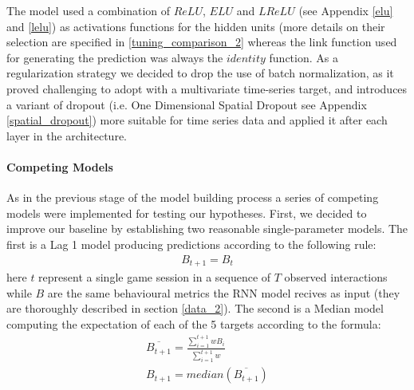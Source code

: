 The model used a combination of $ReLU$, $ELU$ and $LReLU$ (see Appendix \ref{elu} and \ref{lelu}) as activations functions for the hidden units (more details on their selection are specified in \ref{tuning_comparison_2} whereas the link function used for generating the prediction was always the $identity$ function. As a regularization strategy we decided to drop the use of batch normalization, as it proved challenging to adopt with a multivariate time-series target, and introduces a variant of dropout (i.e. One Dimensional Spatial Dropout see Appendix \ref{spatial_dropout}) more suitable for time series data and applied it after each layer in the architecture.

\paragraph{Competing Models}
\label{competing_models_2}
As in the previous stage of the model building process a series of competing models were implemented for testing our hypotheses. First, we decided to improve our baseline by establishing two reasonable single-parameter models. The first is a Lag 1 model producing predictions according to the following rule:
\begin{equation}
   \begin{gathered}  
     B_{t+1} = B_{t}
     \label{lag_1}
  \end{gathered}
\end{equation}
here $t$ represent a single game session in a sequence of $T$ observed interactions while $B$ are the same behavioural metrics the RNN model recives as input (they are thoroughly described in section \ref{data_2}). The second is a Median model computing the expectation of each of the 5 targets according to the formula:
\begin{equation}
  \begin{gathered}  
    \overline{B_{t+1}} = \frac
      {\sum_{i=1}^{t+1} wB_{i}}
      {\sum_{i=1}^{t+1} w }\\
    B_{t+1} = median(\overline{B_{t+1}}) 
    \label{median}
  \end{gathered}
\end{equation}
